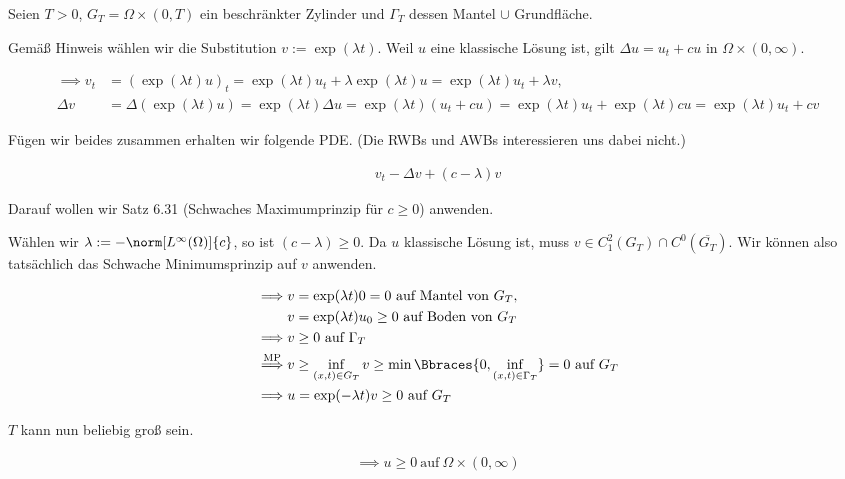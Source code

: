 \begin{solution}

Seien $T > 0$, $G_T = \Omega \times (0, T)$ ein beschränkter Zylinder und $\Gamma_T$ dessen Mantel $\cup$ Grundfläche.

Gemäß Hinweis wählen wir die Substitution $v := \exp(\lambda t)$.
Weil $u$ eine klassische Lösung ist, gilt $\Delta u = u_t + c u$ in $\Omega \times (0, \infty)$.

\begin{align*}
  \implies
  v_t
  & =
  (\exp(\lambda t) u)_t
  =
  \exp (\lambda t) u_t
  +
  \lambda \exp(\lambda t) u
  =
  \exp (\lambda t) u_t + \lambda v, \\
  \Delta v
  & =
  \Delta (\exp(\lambda t) u)
  =
  \exp(\lambda t) \Delta u
  =
  \exp(\lambda t) (u_t + c u)
  =
  \exp(\lambda t) u_t + \exp(\lambda t) c u
  =
  \exp(\lambda t) u_t + c v
\end{align*}

Fügen wir beides zusammen erhalten wir folgende PDE.
(Die RWBs und AWBs interessieren uns dabei nicht.)

\begin{align*}
  v_t - \Delta v + (c - \lambda) v
\end{align*}

Darauf wollen wir Satz 6.31 (Schwaches Maximumprinzip für $c \geq 0$) anwenden.


Wählen wir $\lambda := - \norm[L^\infty(\Omega)]{c}$, so ist $(c - \lambda) \geq 0$.
Da $u$ klassische Lösung ist, muss $v \in C_{1}^{2}(G_T) \cap C^0(\overline{G_T})$.
Wir können also tatsächlich das Schwache Minimumsprinzip auf $v$ anwenden.

\begin{align*}
  \implies
  & v = \exp(\lambda t) 0 = 0 ~\text{auf Mantel von}~ G_T, \\
  & v = \exp(\lambda t) u_0 \geq 0 ~\text{auf Boden von}~ G_T \\
  \implies
  & v \geq 0 ~\text{auf}~ \Gamma_T \\
  \stackrel{\mathrm{MP}}{\implies}
  & v \geq \inf_{(x, t) \in G_T} v \geq \min \Bbraces{0, \inf_{(x, t) \in \Gamma_T}} = 0 ~\text{auf}~ G_T \\
  \implies
  & u = \exp(-\lambda t) v \geq 0 ~\text{auf}~ G_T
\end{align*}

$T$ kann nun beliebig groß sein.

\begin{align*}
  \implies u \geq 0 ~\text{auf}~ \Omega \times (0, \infty)
\end{align*}

\end{solution}

